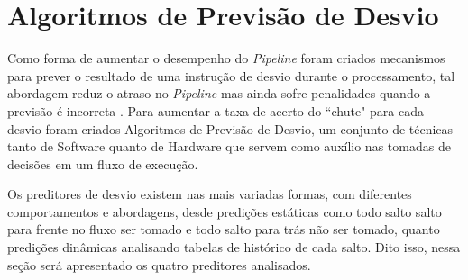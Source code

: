 \documentclass[12pt]{article}
\begin{document}
\section{Algoritmos de Previsão de Desvio}

Como forma de aumentar o desempenho do \textit{Pipeline} foram criados mecanismos para prever o resultado de uma instrução de desvio durante o processamento, tal abordagem reduz o atraso no \textit{Pipeline} mas ainda sofre penalidades quando a previsão é incorreta \cite{Smith:1981:SBP:800052.801871}. Para aumentar a taxa de acerto do ``chute" para cada desvio foram criados Algoritmos de Previsão de Desvio, um conjunto de técnicas tanto de Software quanto de Hardware que servem como auxílio nas tomadas de decisões em um fluxo de execução.

Os preditores de desvio existem nas mais variadas formas, com diferentes comportamentos e abordagens, desde predições estáticas como todo salto salto para frente no fluxo ser tomado e todo salto para trás não ser tomado, quanto predições dinâmicas analisando tabelas de histórico de cada salto. Dito isso, nessa seção será apresentado os quatro preditores analisados.
\end{document}
